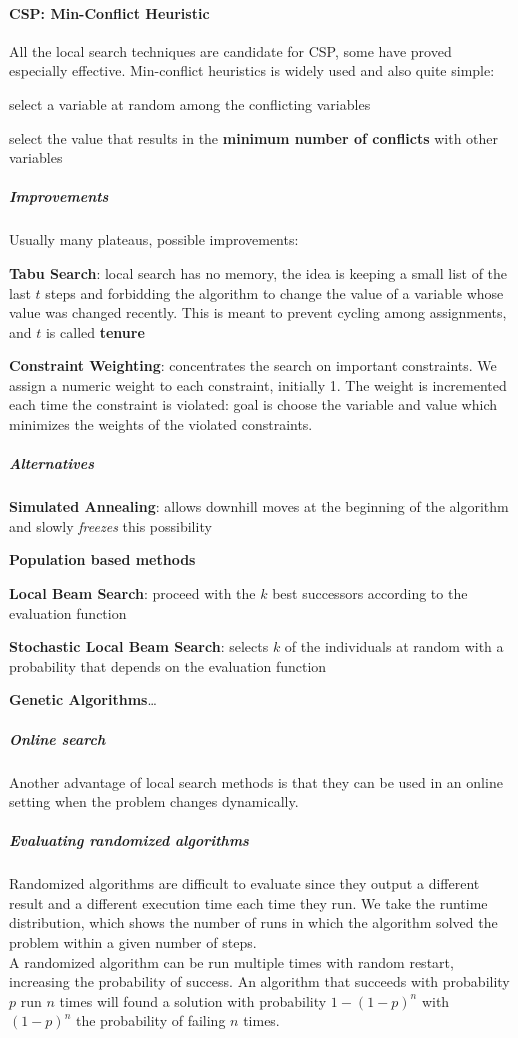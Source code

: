 \documentclass[10pt]{report}
\begin{document}
\paragraph{CSP: Min-Conflict Heuristic} All the local search techniques are candidate for CSP, some have proved especially effective. Min-conflict heuristics is widely used and also quite simple:
\begin{list}{}{}
	\item select a variable at random among the conflicting variables
	\item select the value that results in the \textbf{minimum number of conflicts} with other variables
\end{list}
\subparagraph{Improvements} Usually many plateaus, possible improvements:
\begin{list}{}{}
	\item \textbf{Tabu Search}: local search has no memory, the idea is keeping a small list of the last $t$ steps and forbidding the algorithm to change the value of a variable whose value was changed recently. This is meant to prevent cycling among assignments, and $t$ is called \textbf{tenure}
	\item \textbf{Constraint Weighting}: concentrates the search on important constraints. We assign a numeric weight to each constraint, initially 1. The weight is incremented each time the constraint is violated: goal is choose the variable and value which minimizes the weights of the violated constraints.
\end{list}
\subparagraph{Alternatives}\begin{list}{}{}
	\item \textbf{Simulated Annealing}: allows downhill moves at the beginning of the algorithm and slowly \textit{freezes} this possibility
	\item \textbf{Population based methods}
	\begin{list}{}{}
		\item \textbf{Local Beam Search}: proceed with the $k$ best successors according to the evaluation function
		\item \textbf{Stochastic Local Beam Search}: selects $k$ of the individuals at random with a probability that depends on the evaluation function
		\item \textbf{Genetic Algorithms}\ldots
	\end{list}
\end{list}
\subparagraph{Online search} Another advantage of local search methods is that they can be used in an online setting when the problem changes dynamically.
\subparagraph{Evaluating randomized algorithms} Randomized algorithms are difficult to evaluate since they output a different result and a different execution time each time they run. We take the runtime distribution, which shows the number of runs in which the algorithm solved the problem within a given number of steps.\\
A randomized algorithm can be run multiple times with random restart, increasing the probability of success. An algorithm that succeeds with probability $p$ run $n$ times will found a solution with probability $1 - (1-p)^n$ with $(1-p)^n$ the probability of failing $n$ times.
\end{document}
